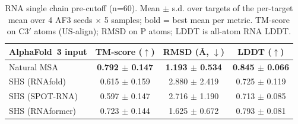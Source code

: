 \begin{table}[htbp]
\centering
\caption{RNA single chain pre-cutoff (n=60). Mean $\pm$ s.d. over targets of the per-target mean over 4 AF3 seeds $\times$ 5 samples; bold = best mean per metric. TM-score on C3$'$ atoms (US-align); RMSD on P atoms; LDDT is all-atom RNA LDDT.}
\label{tab:rna_single_chain_pre_cutoff}
\begin{tabular}{lccc}
\toprule
AlphaFold~3 input & TM-score ($\uparrow$) & RMSD (\AA, $\downarrow$) & LDDT ($\uparrow$) \\
\midrule
Natural MSA & \textbf{0.792 $\pm$ 0.147} & \textbf{1.193 $\pm$ 0.534} & \textbf{0.845 $\pm$ 0.066} \\
SHS (RNAfold) & 0.615 $\pm$ 0.159 & 2.880 $\pm$ 2.419 & 0.725 $\pm$ 0.119 \\
SHS (SPOT-RNA) & 0.597 $\pm$ 0.147 & 2.716 $\pm$ 1.190 & 0.713 $\pm$ 0.085 \\
SHS (RNAformer) & 0.723 $\pm$ 0.144 & 1.625 $\pm$ 0.672 & 0.793 $\pm$ 0.081 \\
\bottomrule
\end{tabular}
\end{table}
